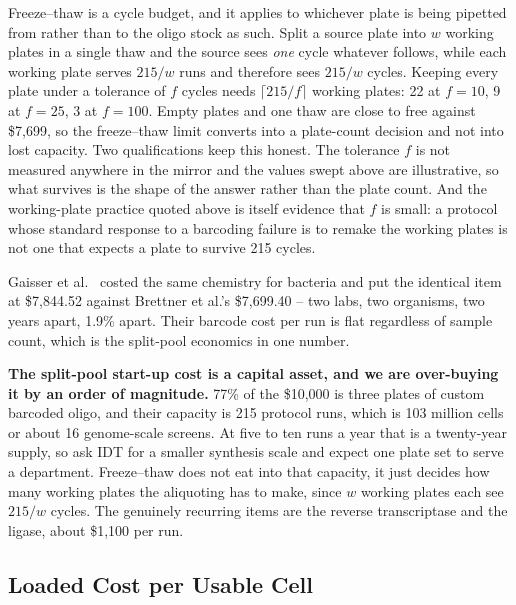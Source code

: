Freeze--thaw is a cycle budget, and it applies to whichever plate is being
pipetted from rather than to the oligo stock as such. Split a source plate into
$w$ working plates in a single thaw and the source sees \emph{one} cycle whatever
follows, while each working plate serves $215/w$ runs and therefore sees $215/w$
cycles. Keeping every plate under a tolerance of $f$ cycles needs
$\lceil 215/f\rceil$ working plates: 22 at $f=10$, 9 at $f=25$, 3 at $f=100$.
Empty plates and one thaw are close to free against \$7{,}699, so the freeze--thaw
limit converts into a plate-count decision and not into lost capacity. Two
qualifications keep this honest. The tolerance $f$ is not measured anywhere in
the mirror and the values swept above are illustrative, so what survives is the
shape of the answer rather than the plate count. And the working-plate practice
quoted above is itself evidence that $f$ is small: a protocol whose standard
response to a barcoding failure is to remake the working plates is not one that
expects a plate to survive 215 cycles.

 Gaisser et al.\ \citep{gaisserHighthroughputSinglecellTranscriptomics2024}
costed the same chemistry for bacteria and put the identical item at \$7{,}844.52
against Brettner et al.'s \$7{,}699.40 -- two labs, two organisms, two years apart,
1.9\% apart. Their barcode cost per run is flat regardless of sample count, which
is the split-pool economics in one number.

\begin{keybox}
\textbf{The split-pool start-up cost is a capital asset, and we are over-buying
it by an order of magnitude.} 77\% of the \$10{,}000 is three plates of custom
barcoded oligo, and their capacity is 215 protocol runs, which is 103 million
cells or about 16 genome-scale screens. At five to ten runs a year that is a
twenty-year supply, so ask IDT for a smaller synthesis scale and expect one plate
set to serve a department. Freeze--thaw does not eat into that capacity, it just
decides how many working plates the aliquoting has to make, since $w$ working
plates each see $215/w$ cycles. The genuinely recurring items are the reverse
transcriptase and the ligase, about \$1{,}100 per run.
\end{keybox}

\subsection{Loaded Cost per Usable Cell}
\label{sec:cost-per-cell}

